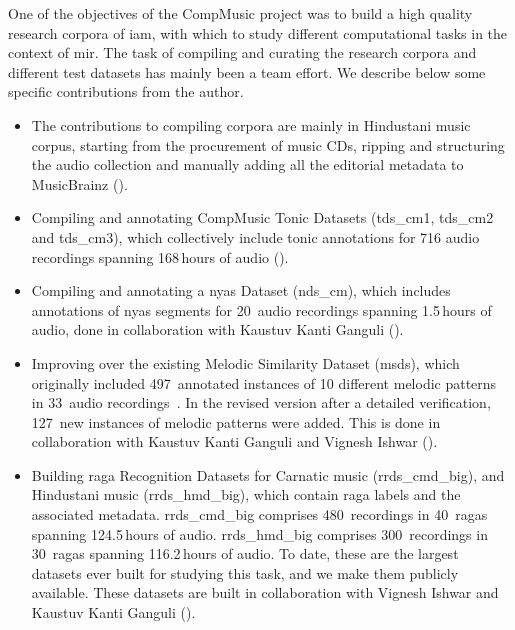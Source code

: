 One of the objectives of the CompMusic project was to build a high quality research corpora of \gls{iam}, with which to study different computational tasks in the context of \gls{mir}. The task of compiling and curating the research corpora and different test datasets has mainly been a team effort. We describe below some specific contributions from the author. 

\begin{itemize}
	
	\item The contributions to compiling corpora are mainly in Hindustani music corpus, starting from the procurement of music CDs, ripping and structuring the audio collection and manually adding all the editorial metadata to MusicBrainz (). 

	\item Compiling and annotating CompMusic Tonic Datasets (\acrshort{tds_cm1}, \acrshort{tds_cm2} and \acrshort{tds_cm3}), which collectively include tonic annotations for 716 audio recordings spanning 168\,hours of audio ().
	
	\item Compiling and annotating a \Gls{nyas} Dataset (\acrshort{nds_cm}), which includes annotations of \gls{nyas} segments for 20~audio recordings spanning 1.5\,hours of audio, done in collaboration with Kaustuv Kanti Ganguli (). 
	
	\item Improving over the existing Melodic Similarity Dataset (\acrshort{msds}), which originally included 497~annotated instances of 10 different melodic patterns in 33~audio recordings~\citep{Ishwar2013,Ross2012b}. In the revised version after a detailed verification, 127~new instances of melodic patterns were added. This is done in collaboration with Kaustuv Kanti Ganguli and Vignesh Ishwar ().
	
	\item Building \Gls{raga} Recognition Datasets for Carnatic music (\acrshort{rrds_cmd_big}), and Hindustani music (\acrshort{rrds_hmd_big}), which contain \gls{raga} labels and the associated metadata. \acrshort{rrds_cmd_big} comprises 480~recordings in 40~\glspl{raga} spanning 124.5\,hours of audio. \acrshort{rrds_hmd_big} comprises 300~recordings in 30~\glspl{raga} spanning 116.2\,hours of audio. To date, these are the largest datasets ever built for studying this task, and we make them publicly available. These datasets are built in collaboration with Vignesh Ishwar and Kaustuv Kanti Ganguli ().
	
\end{itemize}

